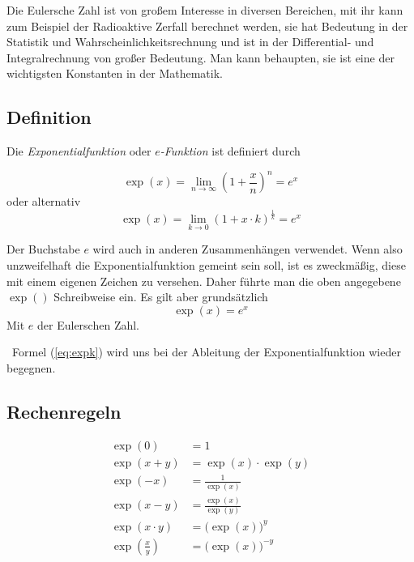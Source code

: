Die Eulersche Zahl ist von großem Interesse in diversen Bereichen, mit ihr kann zum Beispiel der Radioaktive Zerfall berechnet werden, sie hat Bedeutung in der Statistik und Wahrscheinlichkeitsrechnung und ist in der Differential- und Integralrechnung von großer Bedeutung. Man kann behaupten, sie ist eine der wichtigsten Konstanten in der Mathematik.

\subsection{Definition}

\begin{definition}
Die \emph{Exponentialfunktion} oder \emph{$e$-Funktion} ist definiert durch

\begin{equation}\label{eq:expn}
\exp(x) = \lim_{n\rightarrow \infty} \left( 1+\frac{x}{n} \right)^n = e^x
\end{equation}
oder alternativ
\begin{equation}\label{eq:expk}
\exp(x) = \lim_{k\rightarrow 0} \left( 1+x\cdot k \right)^{\frac{1}{k}}= e^x
\end{equation}
\end{definition}
Der Buchstabe $e$ wird auch in anderen Zusammenhängen verwendet. Wenn also unzweifelhaft die Exponentialfunktion gemeint sein soll, ist es zweckmäßig, diese mit einem eigenen Zeichen zu versehen. Daher führte man die oben angegebene $\exp()$ Schreibweise ein. Es gilt aber grundsätzlich
\begin{equation}
\exp(x) = e^x
\end{equation}
Mit $e$ der Eulerschen Zahl.

\HandRight\ Formel (\ref{eq:expk}) wird uns bei der Ableitung der Exponentialfunktion wieder begegnen.

\subsection{Rechenregeln}

\begin{equation}
\begin{split}
\exp(0) &= 1\\
\exp(x+y) &= \exp(x)\cdot \exp(y) \\
\exp(-x) &= \frac{1}{\exp(x)} \\
\exp(x-y) &= \frac{\exp(x)}{\exp(y)} \\
\exp(x\cdot y) &= \big( \exp(x) \big)^y \\
\exp \left(\frac{x}{y} \right) &= \big( \exp(x) \big)^{-y}
\end{split}
\end{equation}



